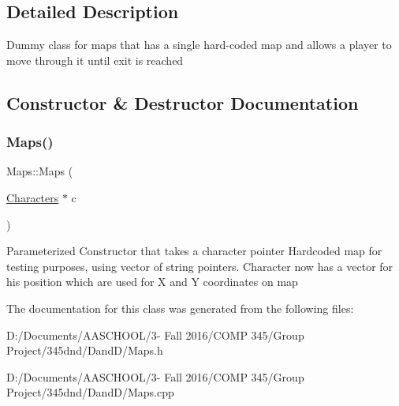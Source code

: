 \subsection{Detailed Description}
Dummy class for maps that has a single hard-\/coded map and allows a player to move through it until exit is reached 

\subsection{Constructor \& Destructor Documentation}
\hypertarget{class_maps_a7396b48b15d3044eaba86e0d6c6bce11}{}\label{class_maps_a7396b48b15d3044eaba86e0d6c6bce11} 
\subsubsection{\texorpdfstring{Maps()}{Maps()}}
{\footnotesize\ttfamily Maps\+::\+Maps (\begin{DoxyParamCaption}\item[{\hyperlink{class_characters}{Characters} $\ast$}]{c }\end{DoxyParamCaption})}

Parameterized Constructor that takes a character pointer Hardcoded map for testing purposes, using vector of string pointers. Character now has a vector for his position which are used for X and Y coordinates on map 

The documentation for this class was generated from the following files\+:\begin{DoxyCompactItemize}
\item 
D\+:/\+Documents/\+A\+A\+S\+C\+H\+O\+O\+L/3-\/ Fall 2016/\+C\+O\+M\+P 345/\+Group Project/345dnd/\+Dand\+D/Maps.\+h\item 
D\+:/\+Documents/\+A\+A\+S\+C\+H\+O\+O\+L/3-\/ Fall 2016/\+C\+O\+M\+P 345/\+Group Project/345dnd/\+Dand\+D/Maps.\+cpp\end{DoxyCompactItemize}

